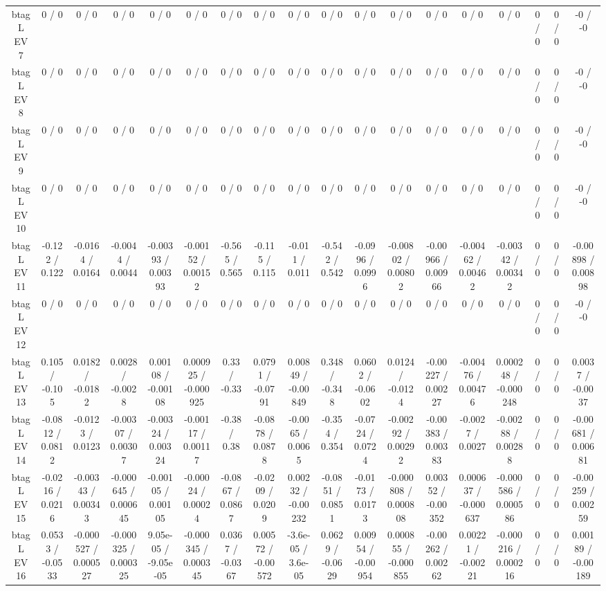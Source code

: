 \documentclass[10pt]{article}
\begin{document}
\begin{table}[htbp]
\begin{center}
\begin{tabular}{|c|c|c|c|c|c|c|c|c|c|c|c|c|c|c|c|c|c|}
  btag L EV 7 & 0 / 0 & 0 / 0 & 0 / 0 & 0 / 0 & 0 / 0 & 0 / 0 & 0 / 0 & 0 / 0 & 0 / 0 & 0 / 0 & 0 / 0 & 0 / 0 & 0 / 0 & 0 / 0 & 0 / 0 & 0 / 0 & -0 / -0 \\ 
  btag L EV 8 & 0 / 0 & 0 / 0 & 0 / 0 & 0 / 0 & 0 / 0 & 0 / 0 & 0 / 0 & 0 / 0 & 0 / 0 & 0 / 0 & 0 / 0 & 0 / 0 & 0 / 0 & 0 / 0 & 0 / 0 & 0 / 0 & -0 / -0 \\ 
  btag L EV 9 & 0 / 0 & 0 / 0 & 0 / 0 & 0 / 0 & 0 / 0 & 0 / 0 & 0 / 0 & 0 / 0 & 0 / 0 & 0 / 0 & 0 / 0 & 0 / 0 & 0 / 0 & 0 / 0 & 0 / 0 & 0 / 0 & -0 / -0 \\ 
  btag L EV 10 & 0 / 0 & 0 / 0 & 0 / 0 & 0 / 0 & 0 / 0 & 0 / 0 & 0 / 0 & 0 / 0 & 0 / 0 & 0 / 0 & 0 / 0 & 0 / 0 & 0 / 0 & 0 / 0 & 0 / 0 & 0 / 0 & -0 / -0 \\ 
  btag L EV 11 & -0.122 / 0.122 & -0.0164 / 0.0164 & -0.0044 / 0.0044 & -0.00393 / 0.00393 & -0.00152 / 0.00152 & -0.565 / 0.565 & -0.115 / 0.115 & -0.011 / 0.011 & -0.542 / 0.542 & -0.0996 / 0.0996 & -0.00802 / 0.00802 & -0.00966 / 0.00966 & -0.00462 / 0.00462 & -0.00342 / 0.00342 & 0 / 0 & 0 / 0 & -0.00898 / 0.00898 \\ 
  btag L EV 12 & 0 / 0 & 0 / 0 & 0 / 0 & 0 / 0 & 0 / 0 & 0 / 0 & 0 / 0 & 0 / 0 & 0 / 0 & 0 / 0 & 0 / 0 & 0 / 0 & 0 / 0 & 0 / 0 & 0 / 0 & 0 / 0 & -0 / -0 \\ 
  btag L EV 13 & 0.105 / -0.105 & 0.0182 / -0.0182 & 0.0028 / -0.0028 & 0.00108 / -0.00108 & 0.000925 / -0.000925 & 0.33 / -0.33 & 0.0791 / -0.0791 & 0.00849 / -0.00849 & 0.348 / -0.348 & 0.0602 / -0.0602 & 0.0124 / -0.0124 & -0.00227 / 0.00227 & -0.00476 / 0.00476 & 0.000248 / -0.000248 & 0 / 0 & 0 / 0 & 0.0037 / -0.0037 \\ 
  btag L EV 14 & -0.0812 / 0.0812 & -0.0123 / 0.0123 & -0.00307 / 0.00307 & -0.00324 / 0.00324 & -0.00117 / 0.00117 & -0.38 / 0.38 & -0.0878 / 0.0878 & -0.0065 / 0.0065 & -0.354 / 0.354 & -0.0724 / 0.0724 & -0.00292 / 0.00292 & -0.00383 / 0.00383 & -0.0027 / 0.0027 & -0.00288 / 0.00288 & 0 / 0 & 0 / 0 & -0.00681 / 0.00681 \\ 
  btag L EV 15 & -0.0216 / 0.0216 & -0.00343 / 0.00343 & -0.000645 / 0.000645 & -0.00105 / 0.00105 & -0.00024 / 0.00024 & -0.0867 / 0.0867 & -0.0209 / 0.0209 & 0.00232 / -0.00232 & -0.0851 / 0.0851 & -0.0173 / 0.0173 & -0.000808 / 0.000808 & 0.00352 / -0.00352 & 0.000637 / -0.000637 & -0.000586 / 0.000586 & 0 / 0 & 0 / 0 & -0.00259 / 0.00259 \\ 
  btag L EV 16 & 0.0533 / -0.0533 & -0.000527 / 0.000527 & -0.000325 / 0.000325 & 9.05e-05 / -9.05e-05 & -0.000345 / 0.000345 & 0.0367 / -0.0367 & 0.00572 / -0.00572 & -3.6e-05 / 3.6e-05 & 0.0629 / -0.0629 & 0.00954 / -0.00954 & 0.000855 / -0.000855 & -0.00262 / 0.00262 & 0.00221 / -0.00221 & -0.000216 / 0.000216 & 0 / 0 & 0 / 0 & 0.00189 / -0.00189 \\ 

\end{tabular}
\end{center}
\end{table}
\end{document}
